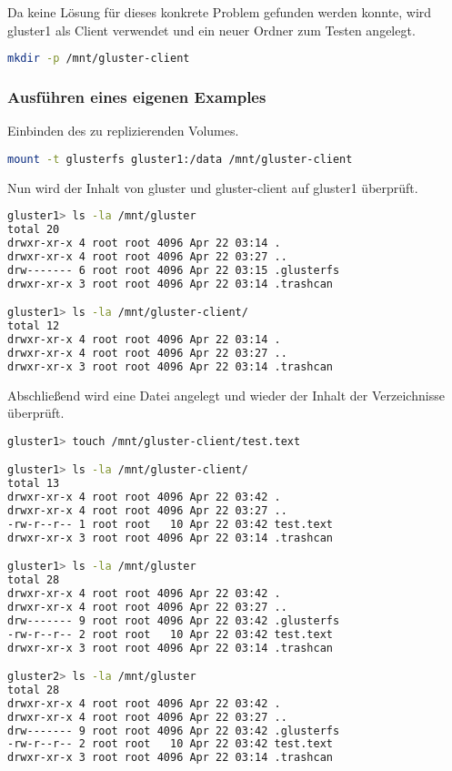 Da keine Lösung für dieses konkrete Problem gefunden werden konnte, wird gluster1 als Client verwendet und ein neuer Ordner zum Testen angelegt.
\begin{lstlisting}[language=bash, caption=Erstellen eines Verzeichnisses welches repliziert wird]
mkdir -p /mnt/gluster-client
\end{lstlisting}

\subsubsection{Ausführen eines eigenen Examples}
\label{subsubsec:Ausführen eines eigenen Examples}
Einbinden des zu replizierenden Volumes.
\begin{lstlisting}[language=bash, caption=Einbinden des zu replizierenden Volumes]
mount -t glusterfs gluster1:/data /mnt/gluster-client
\end{lstlisting}
\clearpage

Nun wird der Inhalt von gluster und gluster-client auf gluster1 überprüft.
\begin{lstlisting}[language=bash, caption=Überprüfen des zu replizierenden und des replizierten Volumes]
gluster1> ls -la /mnt/gluster
total 20
drwxr-xr-x 4 root root 4096 Apr 22 03:14 .
drwxr-xr-x 4 root root 4096 Apr 22 03:27 ..
drw------- 6 root root 4096 Apr 22 03:15 .glusterfs
drwxr-xr-x 3 root root 4096 Apr 22 03:14 .trashcan

gluster1> ls -la /mnt/gluster-client/
total 12
drwxr-xr-x 4 root root 4096 Apr 22 03:14 .
drwxr-xr-x 4 root root 4096 Apr 22 03:27 ..
drwxr-xr-x 3 root root 4096 Apr 22 03:14 .trashcan
\end{lstlisting}

Abschließend wird eine Datei angelegt und wieder der Inhalt der Verzeichnisse überprüft.
\begin{lstlisting}[language=bash, caption=Überprüfen des zu replizierenden und des replizierten Volumes]
gluster1> touch /mnt/gluster-client/test.text

gluster1> ls -la /mnt/gluster-client/
total 13
drwxr-xr-x 4 root root 4096 Apr 22 03:42 .
drwxr-xr-x 4 root root 4096 Apr 22 03:27 ..
-rw-r--r-- 1 root root   10 Apr 22 03:42 test.text
drwxr-xr-x 3 root root 4096 Apr 22 03:14 .trashcan

gluster1> ls -la /mnt/gluster
total 28
drwxr-xr-x 4 root root 4096 Apr 22 03:42 .
drwxr-xr-x 4 root root 4096 Apr 22 03:27 ..
drw------- 9 root root 4096 Apr 22 03:42 .glusterfs
-rw-r--r-- 2 root root   10 Apr 22 03:42 test.text
drwxr-xr-x 3 root root 4096 Apr 22 03:14 .trashcan

gluster2> ls -la /mnt/gluster
total 28
drwxr-xr-x 4 root root 4096 Apr 22 03:42 .
drwxr-xr-x 4 root root 4096 Apr 22 03:27 ..
drw------- 9 root root 4096 Apr 22 03:42 .glusterfs
-rw-r--r-- 2 root root   10 Apr 22 03:42 test.text
drwxr-xr-x 3 root root 4096 Apr 22 03:14 .trashcan
\end{lstlisting}
\clearpage

